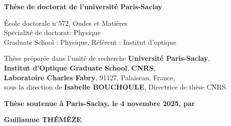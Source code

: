 \documentclass[french,12pt,a4paper]{book}
\begin{document}
\begin{titlepage}
{
\color{black}    
\fontsize{15}{12}\selectfont
\textbf{Thèse de doctorat de l'université Paris-Saclay}
} \\

\vspace{1.5cm}

{
\color{black}    
\fontsize{13}{12}\selectfont
École doctorale n$^{\circ}$572, Ondes et Matières\\
Spécialité de doctorat: Physique\\
Graduate School : Physique, Référent : Institut d’optique \\
}
\vspace{6mm}

{
\color{black}    
\fontsize{12}{12}\selectfont
Thèse préparée dans l'unité de recherche \textbf{Université Paris-Saclay},\\
\textbf{Institut d'Optique Graduate School}, \textbf{CNRS},\\
\textbf{Laboratoire Charles Fabry}, 91127, Palaiseau, France,\\
sous la direction de \textbf{Isabelle BOUCHOULE}, Directrice de thèse CNRS. \\
}
\vspace{10mm}

{
\color{black}    
\fontsize{12}{12}\selectfont
\textbf{Thèse soutenue à Paris-Saclay, le 4 novembre 2025, par}}\\[5mm]
\bigskip

{   
\fontsize{20}{12}\selectfont
    \color{Prune} \textbf{Guillaume THÉMÈZE}
}

\vspace{\fill} %

\bigskip


\end{titlepage}
\end{document}
